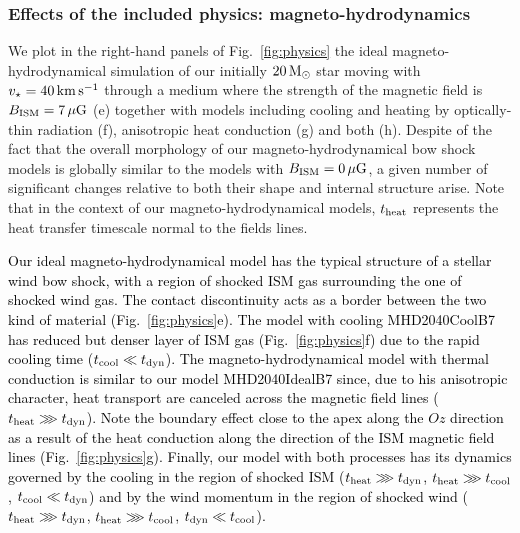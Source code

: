 \documentclass[useAMS,usenatbib]{mn2e}
\begin{document}



\subsubsection{Effects of the included physics: magneto-hydrodynamics}
\label{sect:physics2}


We plot in the right-hand panels of Fig.~\ref{fig:physics} the ideal
magneto-hydrodynamical simulation of our initially $20\, \rm M_{\odot}$ star
moving with $v_{\star}=40\, \rm km\, \rm s^{-1}$ through a medium where the strength
of the magnetic field is $B_{\rm ISM}=7\, \mu \rm G$ (e) together with models
including cooling and heating by optically-thin radiation (f), anisotropic heat
conduction (g) and both (h). Despite of the fact that the overall morphology of
our magneto-hydrodynamical bow shock models is globally similar to the models
with $B_{\rm ISM}=0\, \mu \rm G$, a given number of significant changes relative
to both their shape and internal structure arise. Note that in the context of
our magneto-hydrodynamical models, $t_{\rm heat}$ represents the heat transfer
timescale normal to the fields lines. 


\textcolor{black}{Our ideal magneto-hydrodynamical model has the typical structure 
of a stellar wind bow shock, with a region of shocked ISM gas surrounding the 
one of shocked wind gas. The contact discontinuity acts as a border between 
the two kind of material (Fig.~\ref{fig:physics}e). The model with cooling 
MHD2040CoolB7 has reduced but denser layer of ISM gas (Fig.~\ref{fig:physics}f) 
due to the rapid cooling time ($t_{\rm cool} \ll t_{\rm dyn}$). The magneto-hydrodynamical 
model with thermal conduction is similar to our model MHD2040IdealB7 since, due to  
his anisotropic character, heat transport are canceled across the magnetic field lines 
($t_{\rm heat} \ggg t_{\rm dyn}$). Note the boundary effect close to the apex 
along the $Oz$ direction as a result of the heat conduction along the 
direction of the ISM magnetic field lines (Fig.~\ref{fig:physics}g).  
Finally, our model with both processes has its dynamics governed by the cooling in the 
region of shocked ISM ($t_{\rm heat} \ggg t_{\rm dyn}$, $t_{\rm heat} \ggg t_{\rm cool}$, 
$t_{\rm cool} \ll t_{\rm dyn}$) and by the wind momentum in the region of shocked wind 
($t_{\rm heat} \ggg t_{\rm dyn}$, $t_{\rm heat} \ggg t_{\rm cool}$, $t_{\rm dyn} \ll t_{\rm cool}$).  
} 
\end{document}

